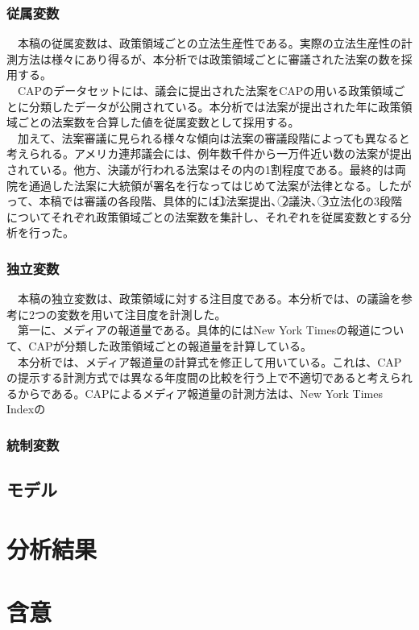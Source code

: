 \documentclass{article}
\begin{document}
\subsubsection{従属変数}
　本稿の従属変数は、政策領域ごとの立法生産性である。実際の立法生産性の計測方法は様々にあり得るが、本分析では政策領域ごとに審議された法案の数を採用する。\\
　CAPのデータセットには、議会に提出された法案をCAPの用いる政策領域ごとに分類したデータが公開されている。本分析では法案が提出された年に政策領域ごとの法案数を合算した値を従属変数として採用する。\\
　加えて、法案審議に見られる様々な傾向は法案の審議段階によっても異なると考えられる。アメリカ連邦議会には、例年数千件から一万件近い数の法案が提出されている。他方、決議が行われる法案はその内の1割程度である。最終的は両院を通過した法案に大統領が署名を行なってはじめて法案が法律となる。したがって、本稿では審議の各段階、具体的には\textcircled{\scriptsize 1}法案提出、\textcircled{\scriptsize 2}議決、\textcircled{\scriptsize 3}立法化の3段階についてそれぞれ政策領域ごとの法案数を集計し、それぞれを従属変数とする分析を行った。\\
\subsubsection{独立変数}
　本稿の独立変数は、政策領域に対する注目度である。本分析では、\citet*{Adler2013-ay}の議論を参考に2つの変数を用いて注目度を計測した。\\
　第一に、メディアの報道量である。具体的にはNew York Timesの報道について、CAPが分類した政策領域ごとの報道量を計算している。\\
　本分析では、メディア報道量の計算式を修正して用いている。これは、CAPの提示する計測方式では異なる年度間の比較を行う上で不適切であると考えられるからである。CAPによるメディア報道量の計測方法は、New York Times Indexの
\subsubsection{統制変数}
\subsection{モデル}
\section{分析結果}

\section{含意}

\newpage

\end{document}

